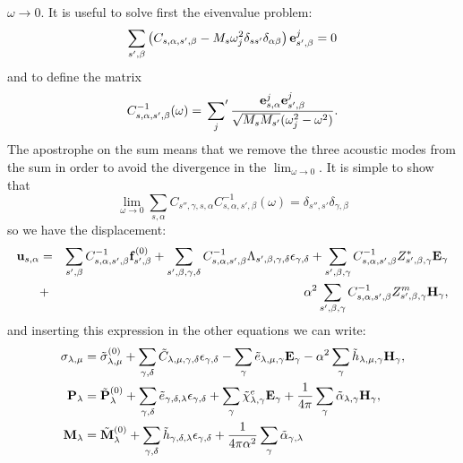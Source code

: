 \documentclass[12pt,a4paper,twoside]{report}
\begin{document}
{$\omega \rightarrow 0$.
It is useful to solve first the eivenvalue problem:
\begin{equation}
\sum_{s',\beta} \left(C_{s,\alpha,s',\beta} - 
M_s \omega_j^2 \delta_{ss'}\delta_{\alpha\beta}\right){\bf e}^j_{s',\beta}=0
\end{equation}
and to define the matrix
\begin{equation}
C^{-1}_{s,\alpha,s',\beta}(\omega) = \sideset{}{'}\sum_j {{\bf e}^j_{s,\alpha} {\bf e}^j_{s',\beta}
\over \sqrt{M_s M_{s'}}(\omega^2_j - \omega^2)}.
\end{equation}
The apostrophe on the sum means that we remove the three acoustic modes
from the sum in order to avoid the divergence in the
$\lim_{\omega\rightarrow 0}$.
It is simple to show that
\begin{equation}
\lim_{\omega\rightarrow 0} \sum_{s,\alpha} C_{s'',\gamma,s,\alpha} C^{-1}_{s,\alpha,s',\beta}(\omega)
=\delta_{s'',s'} \delta_{\gamma,\beta}
\end{equation}
so we have the displacement:
\begin{eqnarray}
{\bf u}_{s,\alpha}&=&\sum_{s',\beta} C^{-1}_{s,\alpha,s',\beta}
{\bf f}^{(0)}_{s',\beta} + \sum_{s',\beta,\gamma,\delta} 
C^{-1}_{s,\alpha,s',\beta}
\Lambda_{s',\beta,\gamma,\delta} \epsilon_{\gamma,\delta}
+ \sum_{s',\beta,\gamma} C^{-1}_{s,\alpha,s',\beta}
Z^*_{s',\beta,\gamma} {\bf E}_{\gamma} \nonumber \\
&+& \alpha^2 \sum_{s',\beta,\gamma} C^{-1}_{s,\alpha,s',\beta} 
Z^m_{s',\beta,\gamma} 
{\bf H}_{\gamma},
\end{eqnarray}
and inserting this expression in the other equations we can write:
\begin{align}
\sigma_{\lambda,\mu}&= \tilde \sigma_{\lambda,\mu}^{(0)}
+\sum_{\gamma,\delta} \tilde C_{\lambda,\mu,\gamma,\delta}  
\epsilon_{\gamma,\delta} -
\sum_{\gamma} \tilde e_{\lambda,\mu,\gamma} 
 {\bf E}_{\gamma}
-\alpha^2 \sum_{\gamma}  \tilde h_{\lambda,\mu,\gamma} 
{\bf H}_{\gamma}, \\
{\bf P}_{\lambda}&= \tilde {\bf P}^{(0)}_{\lambda}
+\sum_{\gamma,\delta} \tilde e_{\gamma,\delta,\lambda} 
\epsilon_{\gamma,\delta} +
\sum_{\gamma} 
\tilde \chi^e_{\lambda,\gamma}
{\bf E}_{\gamma} +
{1\over 4 \pi}\sum_{\gamma} \tilde \alpha_{\lambda,\gamma} 
{\bf H}_{\gamma}, \\
{\bf M}_{\lambda}&= \tilde {\bf M}^{(0)}_{\lambda}
+\sum_{\gamma,\delta}  \tilde h_{\gamma,\delta,\lambda} 
\epsilon_{\gamma,\delta} 
+{1\over 4 \pi \alpha^2} \sum_{\gamma} \tilde \alpha_{\gamma,\lambda} 

\end{align}}
\end{document}
